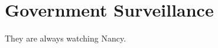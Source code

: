 \documentclass{report}
\author{Rusty Shackelford}
\begin{document}
\maketitle

\section{Government Surveillance}
They are always watching Nancy.
\end{document}
